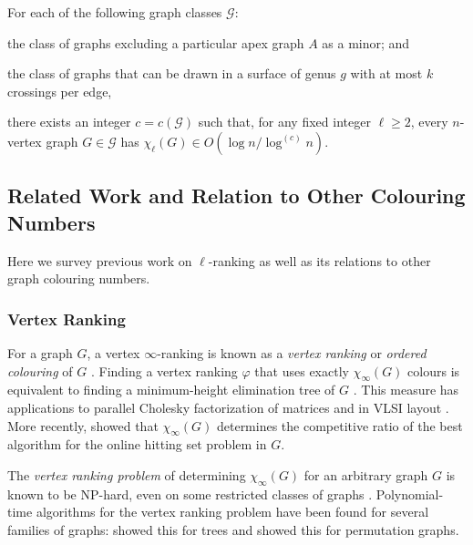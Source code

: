 \documentclass[kpfonts]{patmorin}
\newcommand{\lrn}{\chi_{\ell}}
\theoremstyle{named}
\begin{document}
\begin{thm}\label{meta-theorem}\label{meta}
    For each of the following graph classes $\mathcal{G}$:
    \begin{compactenum}
        \item the class of graphs excluding a particular apex graph $A$ as a minor; and
        \item the class of graphs that can be drawn in a surface of genus $g$ with at most $k$ crossings per edge,
    \end{compactenum}
    there exists an integer $c=c(\mathcal{G})$ such that, for any fixed integer $\ell\ge 2$, every $n$-vertex graph $G\in\mathcal{G}$ has $\lrn(G)\in O(\log n/\log^{(c)} n)$.
\end{thm}



\subsection{Related Work and Relation to Other Colouring Numbers}

Here we survey previous work on $\ell$-ranking as well as its relations to other graph colouring numbers.

\subsubsection{Vertex Ranking}

For a graph $G$, a vertex $\infty$-ranking is known as a \emph{vertex ranking} \cite{bodlaender.deogun.ea:rankings} or \emph{ordered colouring} of $G$ \cite{katchalski.mccuaig.ea:ordered}.  Finding a vertex ranking $\varphi$ that uses exactly $\chi_\infty(G)$ colours is equivalent to finding a minimum-height elimination tree of $G$ \cite{torre.greenlaw.ea:optimal,deogun.kloks.ea:on}.  This measure has applications to parallel Cholesky factorization of matrices \cite{bodlaender.gilbert.ea:approximating,duff.reid:multifrontal,liu:role,dereniowski.kubale:cholesky} and in VLSI layout \cite{leiserson:area,sen.deng.ea:on}.  More recently, \citet{even.smorodinsky:hitting} showed that $\chi_\infty(G)$ determines the competitive ratio of the best algorithm for the online hitting set problem in $G$.

The \emph{vertex ranking problem} of determining $\chi_\infty(G)$ for an arbitrary graph $G$ is known to be NP-hard, even on some restricted classes of graphs \cite{bodlaender.deogun.ea:rankings,llewellyn.tovey.ea:local,llewellyn.tovey.ea:erratum,dereniowski.nadolski:vertex}. Polynomial-time algorithms for the vertex ranking problem have been found for several families of graphs: \citet{schaeffer:optimal,iyer.ratliff.ea:optimal} showed this for trees and \citet{deogun.kloks.ea:on} showed this for permutation graphs.
\end{document}
